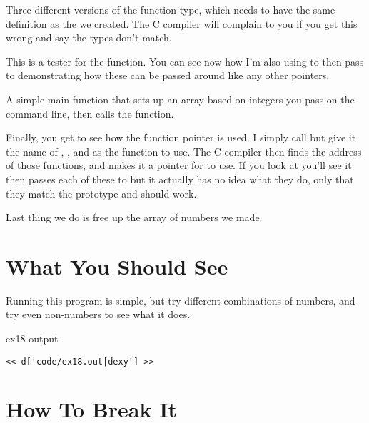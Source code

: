 \begin{description}
\begin{description}
    \end{description}
\item[ex18.c:51-68] Three different versions of the  function type,
    which needs to have the same definition as the  we created.
    The C compiler will complain to you if you get this wrong and say the types don't
    match.
\item[ex18.c:74-87] This is a tester for the  function.  You can 
    see now how I'm also using  to then pass to 
    demonstrating how these can be passed around like any other pointers.
\item[ex18.c:90-103] A simple main function that sets up an array based on integers
    you pass on the command line, then calls the  function.
\item[ex18.c:105-107] Finally, you get to see how the  function
    pointer  is used.  I simply call  but
    give it the name of , , and 
     as the function to use.  The C compiler then finds
    the address of those functions, and makes it a pointer for 
     to use.  If you look at  you'll
    see it then passes each of these to  but it actually
    has no idea what they do, only that they match the  
    prototype and should work.
\item[ex18.c:109] Last thing we do is free up the array of numbers we made.
\end{description}


\section{What You Should See}

Running this program is simple, but try different combinations of numbers, and
try even non-numbers to see what it does.

\begin{code}{ex18 output}
\begin{lstlisting}
<< d['code/ex18.out|dexy'] >>
\end{lstlisting}
\end{code}


\section{How To Break It}

